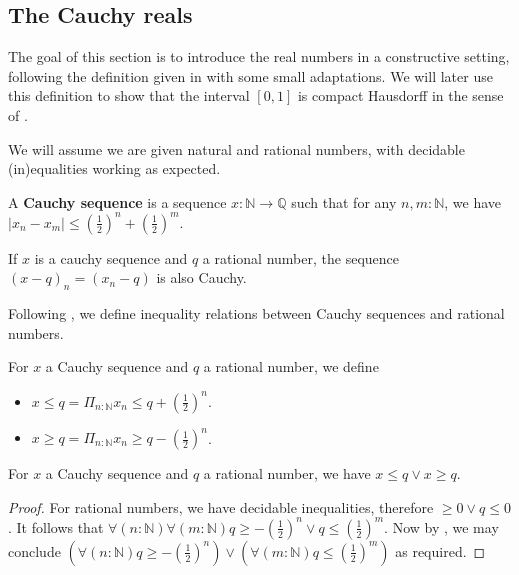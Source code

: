 \subsection{The Cauchy reals}
The goal of this section is to introduce the real numbers in a constructive setting, 
following the definition given in \cite{Bishop} with some small adaptations. 
We will later use this definition to show that the interval $[0,1]$ is compact Hausdorff in the sense 
of . 

We will assume we are given natural and rational numbers, with decidable (in)equalities
working as expected. 

\begin{definition}
  A \textbf{Cauchy sequence} is a sequence $x : \mathbb N \to \mathbb Q$ such that
  for any $n,m:\mathbb N$, we have %
$|x_n-x_m| \leq (\frac12)^n + (\frac12)^m$. 
\end{definition}
\begin{remark}
  If $x$ is a cauchy sequence and $q$ a rational number, the 
  sequence $(x-q)_n = (x_n-q)$ is also Cauchy.
\end{remark}

Following \cite{Bishop}, we define inequality relations between Cauchy sequences and
rational numbers. 
\begin{definition}
  For $x$ a Cauchy sequence and $q$ a rational number, we define 
  \begin{itemize}
    \item $x\leq  q = \Pi_{n:\mathbb N} x_n \leq q+(\frac12)^n$. 
    \item $x\geq  q = \Pi_{n:\mathbb N} x_n \geq q-(\frac12)^n$. 
  \end{itemize}
\end{definition}
\begin{lemma}\label{ComparisonLemma}
  For $x$ a Cauchy sequence and $q$ a rational number, we have
  $x \leq q \vee x \geq q$. 
\end{lemma}
\begin{proof}
  For rational numbers, we have decidable inequalities, 
  therefore $\geq 0 \vee q \leq 0$. 
  It follows that 
  $ \forall (n:\mathbb N) \forall (m:\mathbb N) q \geq -(\frac12)^n \vee q \leq (\frac12)^m$. 
  Now by , we may conclude 
  $ (\forall (n:\mathbb N) q \geq -(\frac12)^n ) \vee (\forall (m:\mathbb N) q \leq (\frac12)^m)$
  as required.
\end{proof}


